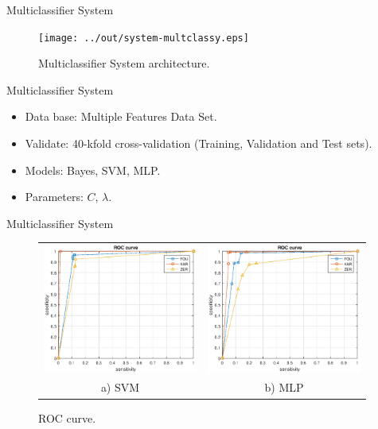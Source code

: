 \documentclass{beamer}
\begin{document}
\begin{frame}{Multiclassifier System}
\begin{figure}[h]
\centering
\texttt{[image: ../out/system-multclassy.eps]}
\caption{Multiclassifier System architecture.}
\label{fig:mult_system_classy}
\end{figure}  
\end{frame}

\begin{frame}{Multiclassifier System}

\begin{itemize}
\item Data base: Multiple Features Data Set.
\item Validate: 40-kfold cross-validation (Training, Validation and Test sets).
\item Models: Bayes, SVM, MLP. 
\item Parameters: $C$, $\lambda$.
\end{itemize}

\end{frame}


\begin{frame}{Multiclassifier System}
\begin{figure}[!h]
\centering
\begin{tabular}{cc}
\includegraphics[width=2.0in]{../out/svm-roc.eps}&
\includegraphics[width=2.0in]{../out/mlp-roc.eps} \\
a) SVM  & b) MLP
\end{tabular}
\caption{ROC curve.}
\label{fig:roc_curve}
\end{figure}
\end{frame}
\end{document}
